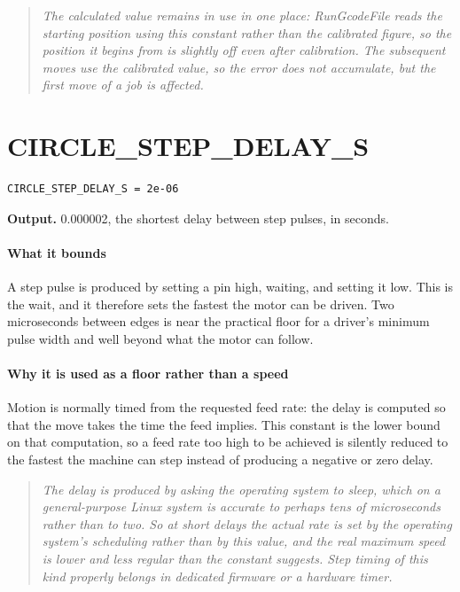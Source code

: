 \begin{quote}\small\itshape The calculated value remains in use in one place: RunGcodeFile reads the starting position using this constant rather than the calibrated figure, so the position it begins from is slightly off even after calibration. The subsequent moves use the calibrated value, so the error does not accumulate, but the first move of a job is affected.\end{quote}

\section{CIRCLE\_STEP\_DELAY\_S}
\begin{lstlisting}[style=sig]
CIRCLE_STEP_DELAY_S = 2e-06
\end{lstlisting}

\noindent\textbf{Output.} 0.000002, the shortest delay between step pulses, in seconds.


\paragraph{What it bounds}
A step pulse is produced by setting a pin high, waiting, and setting it low. This is the wait, and it therefore sets the fastest the motor can be driven. Two microseconds between edges is near the practical floor for a driver's minimum pulse width and well beyond what the motor can follow.


\paragraph{Why it is used as a floor rather than a speed}
Motion is normally timed from the requested feed rate: the delay is computed so that the move takes the time the feed implies. This constant is the lower bound on that computation, so a feed rate too high to be achieved is silently reduced to the fastest the machine can step instead of producing a negative or zero delay.


\begin{quote}\small\itshape The delay is produced by asking the operating system to sleep, which on a general-purpose Linux system is accurate to perhaps tens of microseconds rather than to two. So at short delays the actual rate is set by the operating system's scheduling rather than by this value, and the real maximum speed is lower and less regular than the constant suggests. Step timing of this kind properly belongs in dedicated firmware or a hardware timer.\end{quote}

